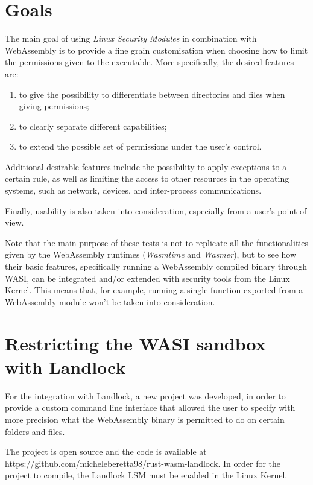 \section{Goals}

The main goal of using \textit{Linux Security Modules} in combination with WebAssembly
is to provide a fine grain customisation when choosing how to limit the permissions given
to the executable. More specifically, the desired features are:
\begin{enumerate}
  \item to give the possibility to differentiate between directories and files when giving permissions;
  \item to clearly separate different capabilities;
  \item to extend the possible set of permissions under the user's control.
\end{enumerate}

Additional desirable features include the possibility to apply exceptions to a certain rule, as well
as limiting the access to other resources in the operating systems, such as network, devices, and
inter-process communications.

Finally, usability is also taken into consideration, especially from a user's point of view.

Note that the main purpose of these tests is not to replicate all the functionalities given by
the WebAssembly runtimes (\textit{Wasmtime} and \textit{Wasmer}), but to see how their basic features,
specifically running a WebAssembly compiled binary through WASI, can be integrated and/or extended with
security tools from the Linux Kernel.
This means that, for example, running a single function exported from a WebAssembly module won't be taken
into consideration.

\section{Restricting the WASI sandbox with Landlock}
\label{sec:restricting-wasi-landlock}

For the integration with Landlock, a new project was developed, in order to provide
a custom command line interface that allowed the user to specify with more precision what
the WebAssembly binary is permitted to do on certain folders and files.

The project is open source and the code is available at \url{https://github.com/micheleberetta98/rust-wasm-landlock}.
In order for the project to compile, the Landlock LSM must be enabled in the Linux Kernel.

